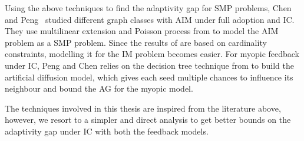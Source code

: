 Using the above techniques to find the adaptivity gap for SMP problems, Chen and Peng~\cite{Chen2019} studied different graph classes with AIM under full adoption and IC. They use multilinear extension and Poisson process from \cite{Asadpour16} to model the AIM problem as a SMP problem. Since the results of \cite{Asadpour16} are based on cardinality constraints, modelling it for the IM problem becomes easier.
For myopic feedback under IC, Peng and Chen \cite{Peng2019} relies on the decision tree technique from \cite{Bradac19} to build the artificial diffusion model, which gives each seed multiple chances to influence its neighbour and bound the AG for the myopic model. 


The techniques involved in this thesis are inspired from the literature above, however, we resort to a simpler and direct analysis to get better bounds on the adaptivity gap under IC with both the feedback models.